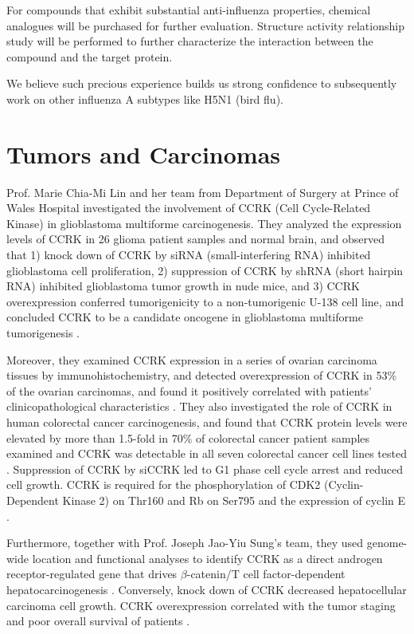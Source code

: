 For compounds that exhibit substantial anti-influenza properties, chemical analogues will be purchased for further evaluation. Structure activity relationship study will be performed to further characterize the interaction between the compound and the target protein.

We believe such precious experience builds us strong confidence to subsequently work on other influenza A subtypes like H5N1 (bird flu).

\section{Tumors and Carcinomas}

Prof. Marie Chia-Mi Lin and her team from Department of Surgery at Prince of Wales Hospital investigated the involvement of CCRK (Cell Cycle-Related Kinase) in glioblastoma multiforme carcinogenesis. They analyzed the expression levels of CCRK in 26 glioma patient samples and normal brain, and observed that 1) knock down of CCRK by siRNA (small-interfering RNA) inhibited glioblastoma cell proliferation, 2) suppression of CCRK by shRNA (short hairpin RNA) inhibited glioblastoma tumor growth in nude mice, and 3) CCRK overexpression conferred tumorigenicity to a non-tumorigenic U-138 cell line, and concluded CCRK to be a candidate oncogene in glioblastoma multiforme tumorigenesis \citep{1144}.

Moreover, they examined CCRK expression in a series of ovarian carcinoma tissues by immunohistochemistry, and detected overexpression of CCRK in 53\% of the ovarian carcinomas, and found it positively correlated with patients' clinicopathological characteristics \citep{1145}. They also investigated the role of CCRK in human colorectal cancer carcinogenesis, and found that CCRK protein levels were elevated by more than 1.5-fold in 70\% of colorectal cancer patient samples examined and CCRK was detectable in all seven colorectal cancer cell lines tested \citep{1143}. Suppression of CCRK by siCCRK led to G1 phase cell cycle arrest and reduced cell growth. CCRK is required for the phosphorylation of CDK2 (Cyclin-Dependent Kinase 2) on Thr160 and Rb on Ser795 and the expression of cyclin E \citep{1143}. 

Furthermore, together with Prof. Joseph Jao-Yiu Sung's team, they used genome-wide location and functional analyses to identify CCRK as a direct androgen receptor-regulated gene that drives $\beta$-catenin/T cell factor-dependent hepatocarcinogenesis \citep{1146}. Conversely, knock down of CCRK decreased hepatocellular carcinoma cell growth. CCRK overexpression correlated with the tumor staging and poor overall survival of patients \citep{1146}.

